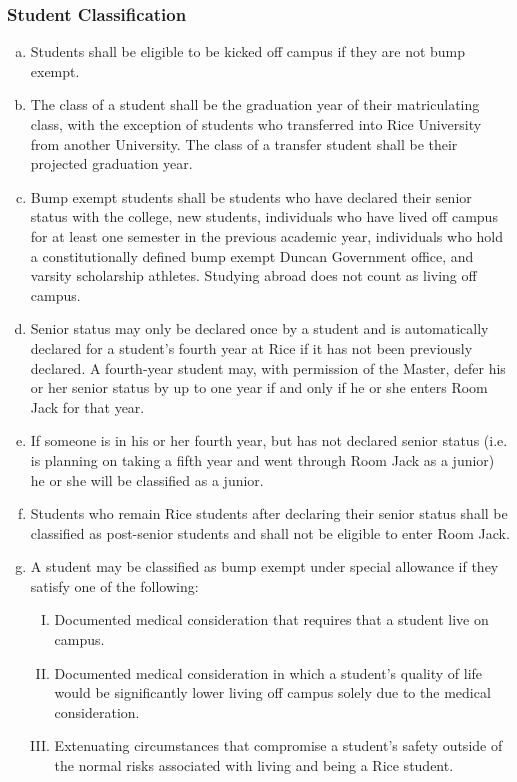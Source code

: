 \documentclass[USletter,12pt]{article}
\begin{document}
\begin{enumerate}[(a)]
\subsubsection{Student Classification}
\begin{enumerate}[(a)]
\item Students shall be eligible to be kicked off campus if they are not bump exempt.
\item The class of a student shall be the graduation year of their matriculating class, with the exception of students who transferred into Rice University from another University. The class of a transfer student shall be their projected graduation year.
\item Bump exempt students shall be students who have declared their senior status with the college, new students, individuals who have lived off campus for at least one semester in the previous academic year, individuals who hold a constitutionally defined bump exempt Duncan Government office, and varsity scholarship athletes.  Studying abroad does not count as living off campus.
\item Senior status may only be declared once by a student and is automatically declared for a student's fourth year at Rice if it has not been previously declared.  A fourth-year student may, with permission of the Master, defer his or her senior status by up to one year if and only if he or she enters Room Jack for that year.
\item If someone is in his or her fourth year, but has not declared senior status (i.e. is planning on taking a fifth year and went through Room Jack as a junior) he or she will be classified as a junior.
\item Students who remain Rice students after declaring their senior status shall be classified as post-senior students and shall not be eligible to enter Room Jack.
\item A student may be classified as bump exempt under special allowance if they satisfy one of the following:
	\begin{enumerate}[(I)]
	\item Documented medical consideration that requires that a student live on campus.
	\item Documented medical consideration in which a student's quality of life would be significantly lower living off campus solely due to the medical consideration.
	\item Extenuating circumstances that compromise a student's safety outside of the normal risks associated with living and being a Rice student.

\end{enumerate}
\end{enumerate}
\end{enumerate}
\end{document}
